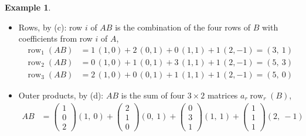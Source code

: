 \documentclass[12pt]{article}
\DeclareMathOperator{\row}{row}
\theoremstyle{definition}
\newtheorem{example}[theorem]{Example}
\begin{document}
\begin{example}
\begin{itemize}
\[\begin{aligned}
Ab_2&=0\begin{pmatrix}1\\0\\2\end{pmatrix}+1\begin{pmatrix}2\\1\\0\end{pmatrix}
+1\begin{pmatrix}0\\3\\1\end{pmatrix}-1\begin{pmatrix}1\\1\\1\end{pmatrix}=\begin{pmatrix}1\\3\\0\end{pmatrix}
\end{aligned}
\]
\item Rows, by (c): row \(i\) of \(AB\) is the combination of the four rows of \(B\) with
coefficients from row \(i\) of \(A\),
\[
\begin{aligned}
\row_1(AB)&=1\,(1,0)+2\,(0,1)+0\,(1,1)+1\,(2,-1)=(3,\ 1)\\
\row_2(AB)&=0\,(1,0)+1\,(0,1)+3\,(1,1)+1\,(2,-1)=(5,\ 3)\\
\row_3(AB)&=2\,(1,0)+0\,(0,1)+1\,(1,1)+1\,(2,-1)=(5,\ 0)
\end{aligned}
\]
\item Outer products, by (d): \(AB\) is the sum of four \(3\times2\) matrices
\(a_r\row_r(B)\),
\[
\begin{aligned}
AB&=\begin{pmatrix}1\\0\\2\end{pmatrix}(1,\ 0)+\begin{pmatrix}2\\1\\0\end{pmatrix}(0,\ 1)
+\begin{pmatrix}0\\3\\1\end{pmatrix}(1,\ 1)+\begin{pmatrix}1\\1\\1\end{pmatrix}(2,\ -1)\\

\end{aligned}\]
\end{itemize}
\end{example}
\end{document}
